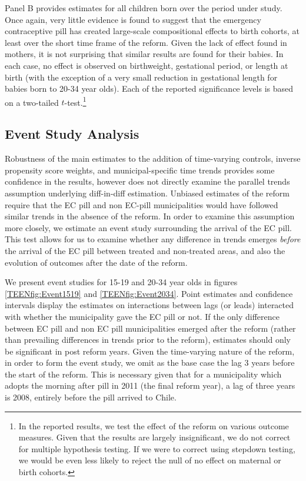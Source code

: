 Panel B provides estimates for all children born over the period under study.
Once again, very little evidence is found to suggest that the emergency 
contraceptive pill has created large-scale compositional effects to birth
cohorts, at least over the short time frame of the reform.  Given the lack of 
effect found in mothers, it is not surprising that similar results are found 
for their babies.  In each case, no effect is observed on birthweight, 
gestational period, or length at birth (with the exception of a very small 
reduction in gestational length for babies born to 20-34 year olds).  Each of 
the reported significance levels is based on a two-tailed $t$-test.\footnote{In
the reported results, we test the effect of the reform on various outcome 
measures.  Given that the results are largely insignificant, we do not correct 
for multiple hypothesis testing.  If we were to correct using stepdown testing,
we would be even less likely to reject the null of no effect on maternal or
birth cohorts.}  


\subsection{Event Study Analysis}
\label{TEENsscn:eventstudy}
Robustness of the main estimates to the addition of time-varying controls, 
inverse propensity score weights, and municipal-specific time trends provides 
some confidence in the results, however does not directly examine the
parallel trends assumption underlying diff-in-diff estimation.  Unbiased 
estimates of the reform require that the EC pill and non EC-pill municipalities 
would have followed similar trends in the absence of the reform.  In order to 
examine this assumption more closely, we estimate an event study surrounding the 
arrival of the EC pill.  This test allows for us to examine whether any 
difference in trends emerges \emph{before} the arrival of the EC pill between 
treated and non-treated areas, and also the evolution of outcomes after the date 
of the reform.

We present event studies for 15-19 and 20-34 year olds in figures 
\ref{TEENfig:Event1519} and \ref{TEENfig:Event2034}.  Point estimates and 
confidence intervals display the estimates on interactions between lags (or 
leads) interacted with whether the municipality gave the EC pill or not.  If the
only difference between EC pill and non EC pill municipalities emerged after the
reform (rather than prevailing differences in trends prior to the reform), 
estimates should only be significant in post reform years. Given the time-varying
nature of the reform, in order to form the event study, we omit as the base case
the lag 3 years before the start of the reform.  This is necessary given that for
a municipality which adopts the morning after pill in 2011 (the final reform 
year), a lag of three years is 2008, entirely before the pill arrived to Chile.

